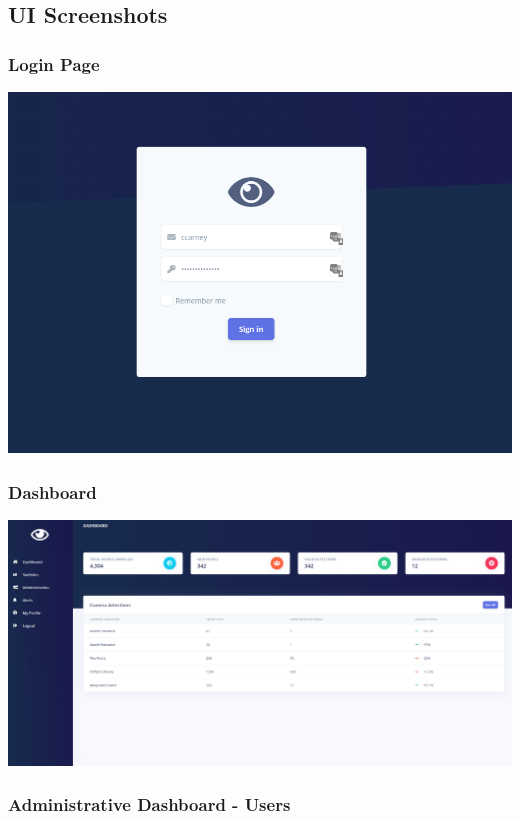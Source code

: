 \documentclass[
  english,
  a4paper,
,tablecaptionabove
]{scrartcl}
\begin{document}
\hypertarget{ui-screenshots}{%
\subsection{UI Screenshots}\label{ui-screenshots}}

\hypertarget{login-page}{%
\subsubsection{Login Page}\label{login-page}}

\includegraphics{images/ppm-images/login.png} \newpage

\hypertarget{dashboard-1}{%
\subsubsection{Dashboard}\label{dashboard-1}}

\includegraphics{images/ppm-images/dashboard.png} \newpage

\hypertarget{administrative-dashboard---users}{%
\subsubsection{Administrative Dashboard -
Users}\label{administrative-dashboard---users}}
\end{document}
